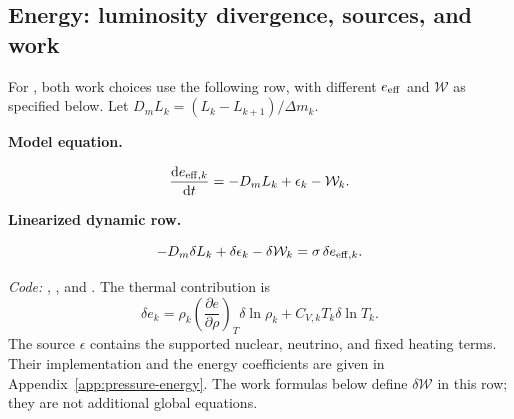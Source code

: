 \documentclass[11pt]{article}
\newenvironment{rowpair}[1]{%
  \def\rowcolor{#1}%
  \begin{tcolorbox}[colback=#1!3!white,colframe=#1,
    coltext=black,boxrule=0.4pt,leftrule=2pt,arc=0pt,
    left=7pt,right=7pt,top=5pt,bottom=3pt,
    before skip=7pt,after skip=7pt]
  \setlength{\abovedisplayskip}{6pt}%
  \setlength{\belowdisplayskip}{6pt}%
  \setlength{\abovedisplayshortskip}{4pt}%
  \setlength{\belowdisplayshortskip}{4pt}%
  \noindent\textbf{Model equation.}\par
}{\end{tcolorbox}\nopagebreak[4]}
\newenvironment{equationblock}{%
  \par\noindent\begin{minipage}{\linewidth}%
}{\end{minipage}\par\addvspace{12pt}}
\newenvironment{linearized}[1]{%
  \par\smallskip\begingroup\color{\rowcolor}%
  \noindent\textbf{Linearized #1.}\par
}{\endgroup}
\newcommand{\dd}{\mathrm{d}}
\newcommand{\code}[1]{\texttt{\detokenize{#1}}}
\begin{document}
\begin{equationblock}
\subsection{Energy: luminosity divergence, sources, and work}
\label{sec:energy-row}

For \code{dedt}, both work choices use the following row, with different
$e_{\rm eff}$ and $\mathcal W$ as specified below. Let
$D_mL_k=(L_k-L_{k+1})/\Delta m_k$.
\begin{rowpair}{LnaDynamic}
\begin{equation}
  \frac{\dd e_{{\rm eff},k}}{\dd t}
    =-D_mL_k+\epsilon_k-\mathcal W_k.
  \label{eq:energy}
\end{equation}
\begin{linearized}{dynamic row}
\begin{equation}
  -D_m\delta L_k+\delta\epsilon_k-\delta\mathcal W_k
    =\sigma\,\delta e_{{\rm eff},k}.
  \label{eq:energy-linear}
\end{equation}
\end{linearized}
\end{rowpair}
\textit{Code:} ,
, and .
The thermal contribution is
\begin{equation}
  \delta e_k=\rho_k\left(\frac{\partial e}{\partial\rho}\right)_T
      \delta\ln\rho_k+C_{V,k}T_k\delta\ln T_k.
  \label{eq:thermalinertia}
\end{equation}
The source $\epsilon$ contains the supported nuclear, neutrino, and fixed
heating terms. Their implementation and the energy coefficients are given
in Appendix~\ref{app:pressure-energy}. The work formulas below define
$\delta\mathcal W$ in this row; they are not additional global equations.
\end{equationblock}
\end{document}

